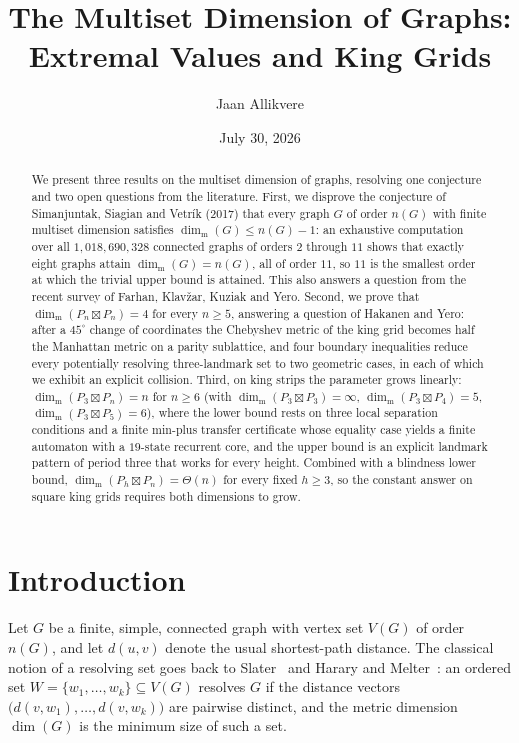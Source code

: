 \documentclass[11pt]{amsart}
\title[Multiset dimension: extremal values and king grids]{The Multiset Dimension of Graphs:\\ Extremal Values and King Grids}
\author{Jaan Allikvere}
\date{July 30, 2026}
\theoremstyle{remark}
\newcommand{\mdim}{\operatorname{dim}_{\mathrm m}}
\newcommand{\dist}{d}
\begin{document}
\begin{abstract}
We present three results on the multiset dimension of graphs, resolving one conjecture and two open questions from the literature.  First, we disprove the conjecture of Simanjuntak, Siagian and Vetr\'ik (2017) that every graph $G$ of order $n(G)$ with finite multiset dimension satisfies $\mdim(G)\le n(G)-1$: an exhaustive computation over all $1{,}018{,}690{,}328$ connected graphs of orders $2$ through $11$ shows that exactly eight graphs attain $\mdim(G)=n(G)$, all of order $11$, so $11$ is the smallest order at which the trivial upper bound is attained.  This also answers a question from the recent survey of Farhan, Klav\v{z}ar, Kuziak and Yero.  Second, we prove that $\mdim(P_n\boxtimes P_n)=4$ for every $n\ge 5$, answering a question of Hakanen and Yero: after a $45^\circ$ change of coordinates the Chebyshev metric of the king grid becomes half the Manhattan metric on a parity sublattice, and four boundary inequalities reduce every potentially resolving three-landmark set to two geometric cases, in each of which we exhibit an explicit collision.  Third, on king strips the parameter grows linearly: $\mdim(P_3\boxtimes P_n)=n$ for $n\ge 6$ (with $\mdim(P_3\boxtimes P_3)=\infty$, $\mdim(P_3\boxtimes P_4)=5$, $\mdim(P_3\boxtimes P_5)=6$), where the lower bound rests on three local separation conditions and a finite min-plus transfer certificate whose equality case yields a finite automaton with a $19$-state recurrent core, and the upper bound is an explicit landmark pattern of period three that works for every height.  Combined with a blindness lower bound, $\mdim(P_h\boxtimes P_n)=\Theta(n)$ for every fixed $h\ge 3$, so the constant answer on square king grids requires both dimensions to grow.
\end{abstract}

\maketitle

\section{Introduction}\label{sec:intro}

Let $G$ be a finite, simple, connected graph with vertex set $V(G)$ of order $n(G)$, and let $\dist(u,v)$ denote the usual shortest-path distance.  The classical notion of a resolving set goes back to Slater~\cite{Slater1975} and Harary and Melter~\cite{HararyMelter1976}: an ordered set $W=\{w_1,\dots,w_k\}\subseteq V(G)$ resolves $G$ if the distance vectors $\bigl(\dist(v,w_1),\dots,\dist(v,w_k)\bigr)$ are pairwise distinct, and the metric dimension $\dim(G)$ is the minimum size of such a set.
\end{document}
